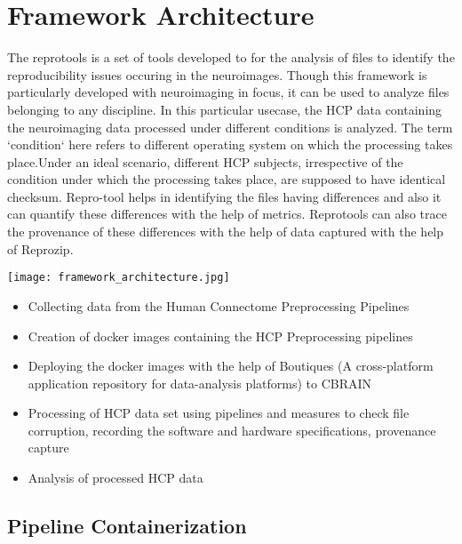 \chapter{Framework Architecture}
The reprotools  is a set of tools developed to for the analysis of files to identify the reproducibility issues occuring in the neuroimages. Though this framework is particularly developed with neuroimaging in focus, it can be used to analyze files belonging to any discipline. In this particular usecase, the HCP data containing the neuroimaging data processed under different conditions is analyzed. The term `condition` here refers to different operating system on which the processing takes place.Under an ideal scenario, different HCP subjects, irrespective of the condition under which the processing takes place, are supposed to have identical checksum. Repro-tool helps in identifying the files having differences and also it can quantify these differences with the help of metrics. Reprotools can also trace the provenance of these differences with the help of data captured with the help of Reprozip.

\begin{center}
\texttt{[image: framework\_architecture.jpg]}
\label{fig:framework_architecture}
\end{center}

  \begin{itemize}
  \item Collecting data from the Human Connectome Preprocessing Pipelines \cite{DBHumanConnectome}
  \item Creation of docker images containing the HCP Preprocessing pipelines
  \item Deploying the docker images with the help of Boutiques (A cross-platform application repository for data-analysis platforms) to CBRAIN
  \item Processing of HCP data set using pipelines and measures to check file corruption, recording the software and hardware specifications, provenance capture
  \item Analysis of processed HCP data
  \end{itemize}

\section{Pipeline Containerization}

